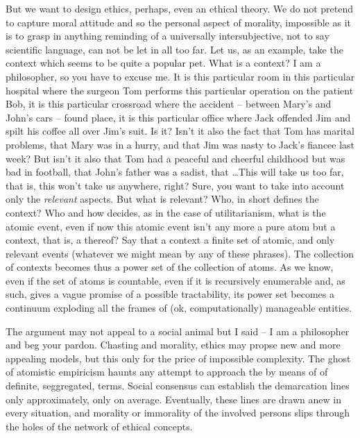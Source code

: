 {{{\pa
But we want to design ethics, perhaps, even an ethical theory. We do 
not pretend to capture moral attitude and so the personal aspect of
morality, impossible as it is to grasp in anything reminding of a
universally intersubjective, not to say scientific language, can not be
let in all too far.  Let us, as an example, take the context which
seems to be quite a popular pet.  What is a context?  I am a
philosopher, so you have to excuse me.  It is this particular room in
this particular hospital where the surgeon Tom performs this
particular operation on the patient Bob, it is this particular
crossroad where the accident -- between Mary's and John's cars --
found place, it is this particular office where Jack offended Jim and
spilt his coffee all over Jim's suit.  Is it?  Isn't it also the fact
that Tom has marital problems, that Mary was in a hurry, and that Jim
was nasty to Jack's fiancee last week?  But isn't it also that Tom had
a peaceful and cheerful childhood but was bad in football, that John's
father was a sadist, that \ldots This will take us too far, that is,
this won't take us anywhere, right?  Sure, you want to take into
account only the {\em relevant} aspects.  But what is relevant?  Who,
in short defines the context?  Who and how decides, as in the case of
utilitarianism, what is the atomic event, even if now this atomic
event isn't any more a pure atom but a context, that is, a
 thereof?  Say that a context a finite set of atomic, and
only relevant events (whatever we might mean by any of these phrases). 
The collection of contexts becomes thus a power set of the collection
of atoms.  As we know, even if the set of atoms is countable, even if
it is recursively enumerable and, as such, gives a vague promise of a
possible tractability, its power set becomes a continuum exploding all
the frames of (ok, computationally) manageable entities.

\pa The argument may not appeal to a social animal but I said
-- I am a philosopher and beg your pardon.  Chasting 
and morality, ethics may propse new and more appealing models, but
this only for the price of impossible complexity.  The ghost of
atomistic empiricism haunts any attempt to approach the 
by means of  of definite, seggregated,  terms. 
Social consensus can establish the demarcation lines only 
approximately, only on average. Eventually, these lines are drawn 
anew in every  situation, and morality or immorality of the 
involved persons slips through the holes of the network of ethical 
concepts.

}}}
